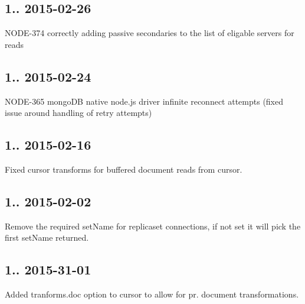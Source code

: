 \subsection*{1.. 2015-\/02-\/26 }


\begin{DoxyItemize}
\item N\+O\+D\+E-\/374 correctly adding passive secondaries to the list of eligable servers for reads
\end{DoxyItemize}

\subsection*{1.. 2015-\/02-\/24 }


\begin{DoxyItemize}
\item N\+O\+D\+E-\/365 mongo\+DB native node.\+js driver infinite reconnect attempts (fixed issue around handling of retry attempts)
\end{DoxyItemize}

\subsection*{1.. 2015-\/02-\/16 }


\begin{DoxyItemize}
\item Fixed cursor transforms for buffered document reads from cursor.
\end{DoxyItemize}

\subsection*{1.. 2015-\/02-\/02 }


\begin{DoxyItemize}
\item Remove the required set\+Name for replicaset connections, if not set it will pick the first set\+Name returned.
\end{DoxyItemize}

\subsection*{1.. 2015-\/31-\/01 }


\begin{DoxyItemize}
\item Added tranforms.\+doc option to cursor to allow for pr. document transformations.
\end{DoxyItemize}


